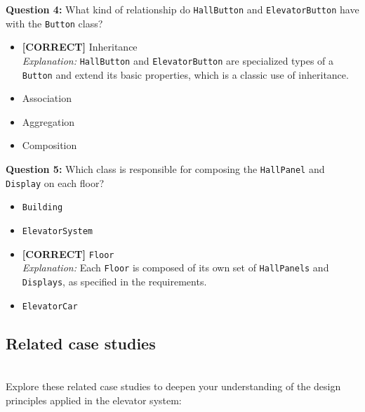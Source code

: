 \vspace{0.3cm}
\noindent
\textbf{Question 4:} What kind of relationship do \texttt{HallButton} and \texttt{ElevatorButton} have with the \texttt{Button} class?
\\[0.2cm]
\begin{itemize}
 \item \textbf{[CORRECT]} Inheritance
\\[0.1cm]
\textit{Explanation:} 
\texttt{HallButton} and \texttt{ElevatorButton} are specialized types of a \texttt{Button} and extend its basic properties, which is a classic use of inheritance.
 \item Association
 \item Aggregation
 \item Composition
\end{itemize}
\vspace{0.3cm}
\noindent
\textbf{Question 5:} Which class is responsible for composing the \texttt{HallPanel} and \texttt{Display} on each floor?
\\[0.2cm]
\begin{itemize}
 \item \texttt{Building}
 \item \texttt{ElevatorSystem}
 \item \textbf{[CORRECT]} \texttt{Floor}
\\[0.1cm]
\textit{Explanation:} 
Each \texttt{Floor} is composed of its own set of \texttt{HallPanels} and \texttt{Displays}, as specified in the requirements.
 \item \texttt{ElevatorCar}
\end{itemize}

\subsection{Related case studies}\label{CzKYJwdQAtExgHT9kYvul}
\\
Explore these related case studies to deepen your understanding of the design principles applied in the elevator system:

